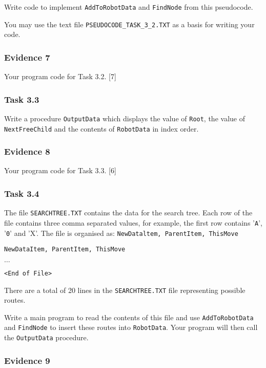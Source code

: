 Write code to implement \texttt{AddToRobotData} and \texttt{FindNode}
from this pseudocode.

You may use the text file \texttt{PSEUDOCODE\_TASK\_3\_2.TXT} as a
basis for writing your code.

\subsubsection*{Evidence 7}

Your program code for Task 3.2. \hfill{}{[}7{]}

\subsubsection*{Task 3.3}

Write a procedure \texttt{OutputData} which displays the value of
\texttt{Root}, the value of \texttt{NextFreeChild} and the contents
of \texttt{RobotData} in index order.

\subsubsection*{Evidence 8}

Your program code for Task 3.3.\hfill{} {[}6{]}

\subsubsection*{Task 3.4}

The file \texttt{SEARCHTREE.TXT} contains the data for the search
tree. Each row of the file contains three comma separated values,
for example, the first row contains '\texttt{A}', '\texttt{0}' and
'X'. The file is organised as: \texttt{NewDataltem, ParentItem, ThisMove}

\texttt{NewDataItem, ParentItem, ThisMove}

\texttt{$\dots$}

\texttt{<End of File>}

There are a total of 20 lines in the \texttt{SEARCHTREE.TXT} file
representing possible routes.

Write a main program to read the contents of this file and use \texttt{AddToRobotData}
and \texttt{FindNode} to insert these routes into \texttt{RobotData}.
Your program will then call the \texttt{OutputData} procedure. 

\subsubsection*{Evidence 9}

